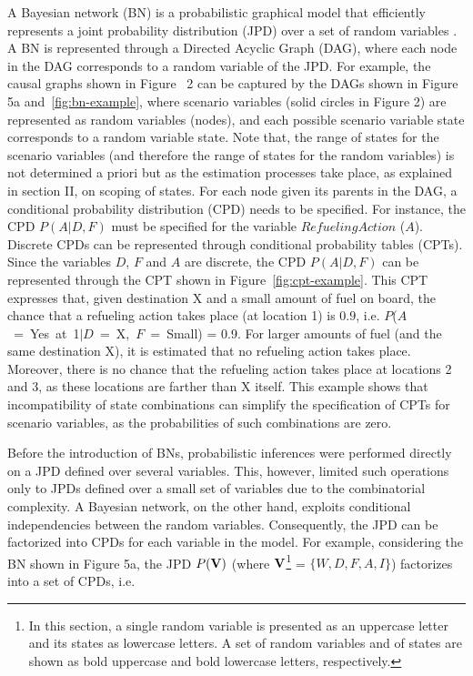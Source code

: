 \documentclass[conference]{IEEEtran}
\begin{document}
A Bayesian network (BN) is a probabilistic graphical model that efficiently represents a joint probability distribution (JPD) over a set of random variables \cite{jensen01book,pearl88book}. A BN is represented through a Directed Acyclic Graph (DAG), where each node in the DAG corresponds to a random variable of the JPD. For example, the causal graphs shown in Figure~ 2 can be captured by the DAGs shown in Figure 5a and~\ref{fig:bn-example}, where scenario variables (solid circles in Figure 2) are represented as random variables (nodes), and each possible scenario variable state corresponds to a random variable state. 
Note that, the range of states for the scenario variables (and therefore the range of states for the random variables) is not determined a priori but as the estimation processes take place, as explained in section II, on scoping of states.
For each node given its parents in the DAG, a conditional probability distribution (CPD) needs to be specified. For instance, the CPD $P(A|D,F)$ must be specified for the variable $RefuelingAction$ ($A$). Discrete CPDs can be represented through conditional probability tables (CPTs).  Since the variables $D$, $F$ and $A$ are discrete, the CPD $P(A|D,F)$ can be represented through the CPT shown in Figure~\ref{fig:cpt-example}. This CPT expresses that, given destination X and a small amount of fuel on board, the chance that a refueling action takes place (at location 1) is $0.9$, i.e. $P$($A$~=~Yes~at~1$|$$D$~=~X,~$F$~=~Small) = 0.9. For larger amounts of fuel (and the same destination X), it is estimated that no refueling action takes place. Moreover, there is no chance that the refueling action takes place at locations 2 and 3, as these locations are farther than X itself. This example shows that incompatibility of state combinations can simplify the specification of CPTs for scenario variables, as the probabilities of such combinations are zero.

Before the introduction of BNs, probabilistic inferences were performed directly on a JPD defined over several variables. This, however, limited such operations only to JPDs defined over a small set of variables due to the combinatorial complexity. A Bayesian network, on the other hand, exploits conditional independencies between the random variables. Consequently, the JPD can be factorized into CPDs for each variable in the model. 
For example, considering the BN shown in Figure 5a, the JPD $P({\mathbf{V}})$ (where ${\mathbf{V}}$\footnote{In this section, a single random variable is presented as an uppercase letter and its states as lowercase letters. A set of random variables and of states are shown as bold uppercase and bold lowercase letters, respectively.} = $\{W, D, F, A, I\}$) factorizes into a set of CPDs, i.e.
\end{document}
